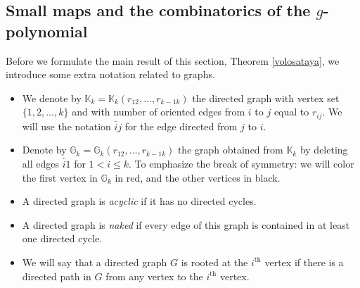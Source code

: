 \subsection{Small maps and the combinatorics of the \texorpdfstring{$g$}{g}-polynomial}\label{S4.2}
Before we  formulate the main result of this section, Theorem \ref{volosataya}, 
we introduce some extra notation related to graphs. 
\begin{itemize}
\item We denote by $\mathbb{K}_k=\mathbb{K}_k(r_{12}, \ldots ,r_{k-1 k})$ the directed graph with vertex set $\{1, 
2, \ldots ,k\}$ and with number of oriented edges from $i$ to $j$ equal to 
$r_{ij}$.  
 We will use the notation $\overleftarrow{ij}$ for the edge directed from $j$ 
 to $i$. 

\item Denote by  $\mathbb{G}_k=\mathbb{G}_k(r_{12}, \ldots ,r_{k-1 k})$ the graph obtained from $\mathbb{K}_k$  by 
deleting all edges $\overleftarrow{i1}$ for $1<i\leq k$. To emphasize the break 
of 
symmetry: we will color the first vertex in $\mathbb{G}_k$ in red,
and the other vertices in black. 



\item A directed graph is \textit{acyclic} if it has no directed cycles. 

\item A directed graph is \textit{naked} if every edge of this graph is contained in at least one directed cycle.

\item We will say that a directed graph $G$ is rooted at the $i^{\text{th}}$ 
vertex if there is a directed path in $G$ from any vertex to the 
$i^{\text{th}}$ vertex. 
\end{itemize}


